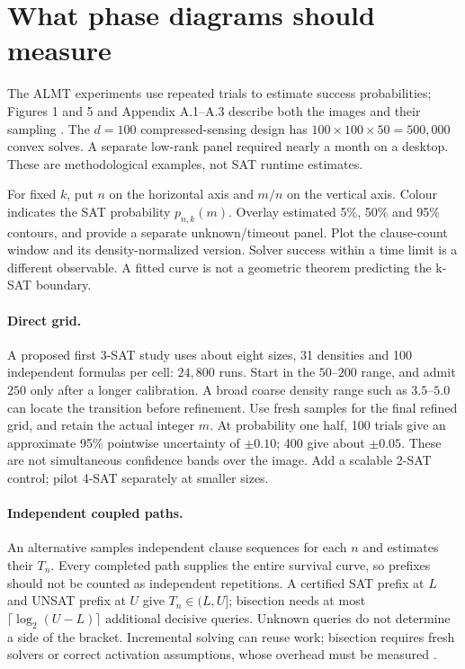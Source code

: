 \documentclass[11pt,a4paper]{article}
\begin{document}
\section{What phase diagrams should measure}
The ALMT experiments use repeated trials to estimate success probabilities;
Figures 1 and 5 and Appendix A.1--A.3 describe both the images and their
sampling \citep{almt2014}. The $d=100$ compressed-sensing design has
$100\times100\times50=500{,}000$ convex solves. A separate low-rank panel
required nearly a month on a desktop. These are methodological examples,
not SAT runtime estimates.

For fixed $k$, put $n$ on the horizontal axis and $m/n$ on the vertical axis.
Colour indicates the SAT probability $p_{n,k}(m)$. Overlay estimated 5\%,
50\% and 95\% contours, and provide a separate unknown/timeout panel.
Plot the clause-count window and its density-normalized version. Solver
success within a time limit is a different observable. A fitted curve is
not a geometric theorem predicting the k-SAT boundary.

\paragraph{Direct grid.}
A proposed first 3-SAT study uses about eight sizes, 31 densities and
100 independent formulas per cell: $24{,}800$ runs. Start in the
$50$--$200$ range, and admit $250$ only after a longer calibration. A broad
coarse density range such as $3.5$--$5.0$ can locate the transition before
refinement. Use fresh samples for the final refined grid, and retain the
actual integer $m$. At probability one half, 100 trials give an approximate
95\% pointwise uncertainty of $\pm0.10$; 400 give about $\pm0.05$.
These are not simultaneous confidence bands over the image. Add a scalable
2-SAT control; pilot 4-SAT separately at smaller sizes.

\paragraph{Independent coupled paths.}
An alternative samples independent clause sequences for each $n$ and
estimates their $T_n$. Every completed path supplies the entire survival
curve, so prefixes should not be counted as independent repetitions. A
certified SAT prefix at $L$ and UNSAT prefix at $U$ give $T_n\in(L,U]$;
bisection needs at most $\lceil\log_2(U-L)\rceil$ additional decisive queries.
Unknown queries do not determine a side of the bracket. Incremental solving
can reuse work; bisection requires fresh solvers or correct activation
assumptions, whose overhead must be measured \citep{pysatAPI}.
\end{document}
